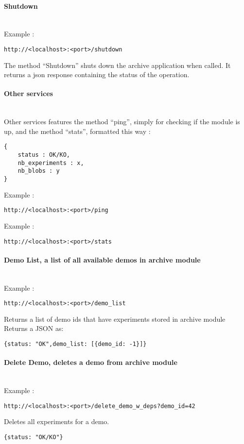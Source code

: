 \paragraph{Shutdown} \hspace{0pt} \\
Example :
\begin{verbatim}
http://<localhost>:<port>/shutdown
\end{verbatim}
The method ``Shutdown'' shuts down the archive application when called. It returns a json response containing the status of the operation.

\paragraph{Other services} \hspace{0pt} \\
Other services features the method ``ping'', simply for checking if the module is up, and the method ``stats'', formatted this way :
\begin{verbatim}
{
    status : OK/KO,
    nb_experiments : x,
    nb_blobs : y
}
\end{verbatim}
Example :
\begin{verbatim}
http://<localhost>:<port>/ping
\end{verbatim}
Example :
\begin{verbatim}
http://<localhost>:<port>/stats
\end{verbatim}

\paragraph{Demo List, a list of all available demos in archive module} \hspace{0pt} \\
Example :
\begin{verbatim}
http://<localhost>:<port>/demo_list
\end{verbatim}
Returns a list of demo ids that have experiments stored in archive module
Returns a  JSON as:
\begin{verbatim}
{status: "OK",demo_list: [{demo_id: -1}]}
\end{verbatim} 


\paragraph{Delete Demo, deletes a demo from archive module} \hspace{0pt} \\
Example :
\begin{verbatim}
http://<localhost>:<port>/delete_demo_w_deps?demo_id=42
\end{verbatim}
Deletes all experiments for a demo.
\begin{verbatim}
{status: "OK/KO"}
\end{verbatim} 
